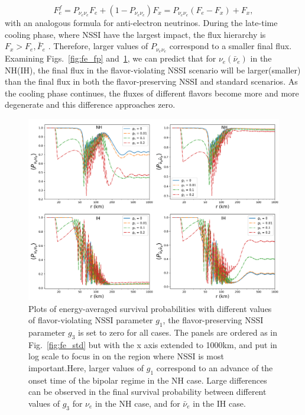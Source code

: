 \documentclass[a4paper,12pt]{article}
\begin{document}
\begin{equation}
F^{f}_{e} = P_{\nu_{e}\nu_{e}}F_{e} + (1-P_{\nu_{e}\nu_{e}})F_{x} = P_{\nu_{e}\nu_{e}}(F_{e} - F_{x}) + F_{x},
\end{equation}
with an analogous formula for anti-electron neutrinos. During the late-time cooling phase, where NSSI have the largest impact, the flux hierarchy is $F_{x} > F_{e},\bar{F}_{e}$ \cite{Nakazato:2012qf}. Therefore, larger values of $P_{\nu_{e}\nu_{e}}$ correspond to a smaller final flux. Examining Figs.~\ref{fig:fe_fp} and~\ref{fig:fe_fv}, we can predict that for $\nu_{e}(\bar{\nu}_{e})$ in the NH(IH), the final flux in the flavor-violating NSSI scenario will be larger(smaller) than the final flux in both the flavor-preserving NSSI and standard scenarios. As the cooling phase continues, the fluxes of different flavors become more and more degenerate and this difference approaches zero.

\begin{figure}[t]
\begin{center}
\includegraphics[width=14cm]{flavor_evo_fv_1km.png}
\caption{Plots of energy-averaged survival probabilities with different values of flavor-violating NSSI parameter $g_1$, the flavor-preserving NSSI parameter $g_3$ is set to zero for all cases. The panels are ordered as in Fig.~\ref{fig:fe_std} but with the x axis extended to 1000km, and put in log scale to focus in on the region where NSSI is most important.Here, larger values of $g_1$ correspond to an advance of the onset time of the bipolar regime in the NH case. Large differences can be observed in the final survival probability between different values of $g_3$ for $\nu_e$ in the NH case, and for $\bar \nu_e$ in the IH case.}
\label{fig:fe_fv}
\end{center}
\end{figure}
\end{document}
